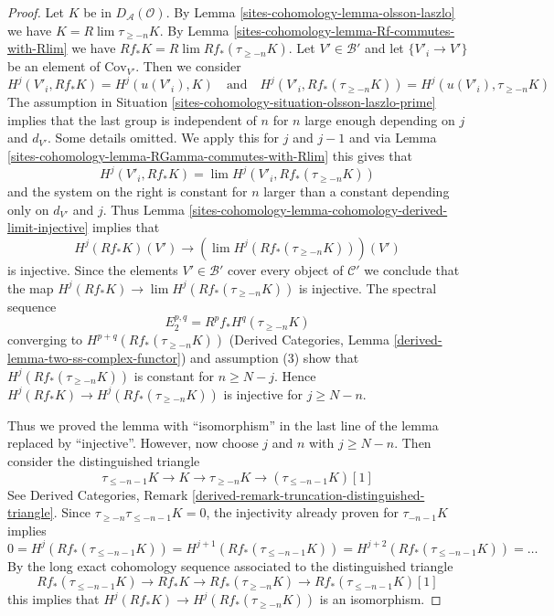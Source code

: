 \begin{proof}
Let $K$ be in $D_\mathcal{A}(\mathcal{O})$.
By Lemma \ref{sites-cohomology-lemma-olsson-laszlo} we have $K = R\lim \tau_{\geq -n}K$.
By Lemma \ref{sites-cohomology-lemma-Rf-commutes-with-Rlim}
we have $Rf_*K = R\lim Rf_*(\tau_{\geq -n}K)$.
Let $V' \in \mathcal{B}'$ and let $\{V'_i \to V'\}$ be an element
of $\text{Cov}_{V'}$. Then we consider
$$
H^j(V'_i, Rf_*K) = H^j(u(V'_i), K)
\quad\text{and}\quad
H^j(V'_i, Rf_*(\tau_{\geq -n}K)) = H^j(u(V'_i), \tau_{\geq -n}K)
$$
The assumption in Situation \ref{sites-cohomology-situation-olsson-laszlo-prime}
implies that the last group is independent of $n$ for $n$ large enough
depending on $j$ and $d_{V'}$. Some details omitted.
We apply this for $j$ and $j - 1$ and via
Lemma \ref{sites-cohomology-lemma-RGamma-commutes-with-Rlim} this gives that
$$
H^j(V'_i, Rf_*K) = \lim H^j(V'_i, Rf_*(\tau_{\geq -n} K))
$$
and the system on the right is constant for $n$ larger than
a constant depending only on $d_{V'}$ and $j$.
Thus Lemma \ref{sites-cohomology-lemma-cohomology-derived-limit-injective}
implies that
$$
H^j(Rf_*K)(V') \longrightarrow
\left(\lim H^j(Rf_*(\tau_{\geq -n}K))\right)(V')
$$
is injective. Since the elements $V' \in \mathcal{B}'$ cover
every object of $\mathcal{C}'$ we conclude that the map
$H^j(Rf_*K) \to \lim H^j(Rf_*(\tau_{\geq -n}K))$ is injective.
The spectral sequence
$$
E_2^{p, q} = R^pf_*H^q(\tau_{\geq -n}K)
$$
converging to $H^{p + q}(Rf_*(\tau_{\geq -n}K))$
(Derived Categories, Lemma \ref{derived-lemma-two-ss-complex-functor})
and assumption (3) show that
$H^j(Rf_*(\tau_{\geq -n}K))$ is constant for $n \geq N - j$.
Hence $H^j(Rf_*K) \to H^j(Rf_*(\tau_{\geq -n}K))$ is injective
for $j \geq N - n$.

\medskip\noindent
Thus we proved the lemma with ``isomorphism'' in the last line of
the lemma replaced by ``injective''. However, now choose $j$ and $n$
with $j \geq N - n$. Then consider the distinguished triangle
$$
\tau_{\leq -n - 1}K \to K \to \tau_{\geq -n}K \to (\tau_{\leq -n - 1}K)[1]
$$
See Derived Categories, Remark
\ref{derived-remark-truncation-distinguished-triangle}.
Since $\tau_{\geq -n}\tau_{\leq -n -1}K = 0$, the
injectivity already proven for $\tau_{-n - 1}K$ implies
$$
0 = H^j(Rf_*(\tau_{\leq -n - 1}K)) =
H^{j + 1}(Rf_*(\tau_{\leq -n - 1}K)) =
H^{j + 2}(Rf_*(\tau_{\leq -n - 1}K)) = \ldots
$$
By the long exact cohomology sequence associated to the distinguished
triangle
$$
Rf_*(\tau_{\leq -n - 1}K) \to Rf_*K \to Rf_*(\tau_{\geq -n}K) \to
Rf_*(\tau_{\leq -n - 1}K)[1]
$$
this implies that $H^j(Rf_*K) \to H^j(Rf_*(\tau_{\geq -n}K))$
is an isomorphism.
\end{proof}


